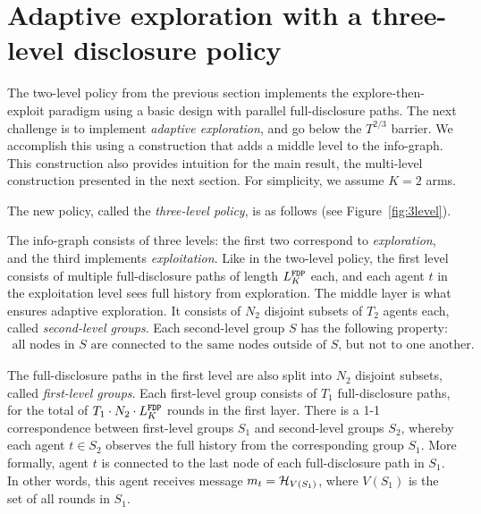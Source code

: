 
\section{Adaptive exploration with a three-level disclosure policy}
\label{sec:3level}

The two-level policy from the previous section implements the explore-then-exploit paradigm using a basic design with parallel full-disclosure paths. The next challenge is to implement \emph{adaptive exploration}, and go below the $T^{2/3}$ barrier. We accomplish this using a construction that adds a middle level to the info-graph. This construction also provides intuition for the main result, the multi-level construction presented in the next section. For simplicity, we assume $K=2$ arms.

The new policy, called the \emph{three-level policy}, is as follows
 (see Figure~\ref{fig:3level}).

\begin{construction}
The info-graph consists of three levels: the first two correspond to \emph{exploration}, and the third implements \emph{exploitation}. Like in the two-level policy, the first level consists of multiple full-disclosure paths of length $L^\mathtt{FDP}_K$ each, and each agent $t$ in the exploitation level sees full history from exploration. The middle layer is what ensures adaptive exploration. It consists of $N_2$ disjoint subsets of $T_2$ agents each, called \emph{second-level groups}. Each second-level group $S$ has the following property:
\begin{align}\label{eq:group-defn}
\text{all nodes in $S$ are connected to the same nodes outside of $S$, but not to one another.}
\end{align}

The full-disclosure paths in the first level are also split into $N_2$ disjoint subsets, called \emph{first-level groups}. Each first-level group consists of $T_1$ full-disclosure paths, for the total of $T_1\cdot N_2\cdot L^\mathtt{FDP}_K$ rounds in the first layer. There is a 1-1 correspondence between first-level groups $S_1$ and second-level groups $S_2$, whereby each agent $t\in S_2$ observes the full history from the corresponding group $S_1$. More formally, agent $t$ is connected to the last node of each full-disclosure path in $S_1$. In other words, this agent receives message
    $m_t = \mathcal{H}_{V(S_1)}$,
where $V(S_1)$ is the set of all rounds in $S_1$. 
\end{construction}

